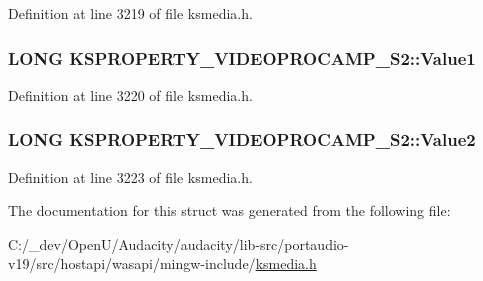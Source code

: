 Definition at line 3219 of file ksmedia.\+h.

\subsubsection[{\texorpdfstring{Value1}{Value1}}]{\setlength{\rightskip}{0pt plus 5cm}L\+O\+NG K\+S\+P\+R\+O\+P\+E\+R\+T\+Y\+\_\+\+V\+I\+D\+E\+O\+P\+R\+O\+C\+A\+M\+P\+\_\+\+S2\+::\+Value1}\hypertarget{struct_k_s_p_r_o_p_e_r_t_y___v_i_d_e_o_p_r_o_c_a_m_p___s2_a60f2292f1cfc6b7eb44bf0ebbc9c877e}{}\label{struct_k_s_p_r_o_p_e_r_t_y___v_i_d_e_o_p_r_o_c_a_m_p___s2_a60f2292f1cfc6b7eb44bf0ebbc9c877e}


Definition at line 3220 of file ksmedia.\+h.

\subsubsection[{\texorpdfstring{Value2}{Value2}}]{\setlength{\rightskip}{0pt plus 5cm}L\+O\+NG K\+S\+P\+R\+O\+P\+E\+R\+T\+Y\+\_\+\+V\+I\+D\+E\+O\+P\+R\+O\+C\+A\+M\+P\+\_\+\+S2\+::\+Value2}\hypertarget{struct_k_s_p_r_o_p_e_r_t_y___v_i_d_e_o_p_r_o_c_a_m_p___s2_a68eb42957cdadb559f384b7fba93c4cd}{}\label{struct_k_s_p_r_o_p_e_r_t_y___v_i_d_e_o_p_r_o_c_a_m_p___s2_a68eb42957cdadb559f384b7fba93c4cd}


Definition at line 3223 of file ksmedia.\+h.



The documentation for this struct was generated from the following file\+:\begin{DoxyCompactItemize}
\item 
C\+:/\+\_\+dev/\+Open\+U/\+Audacity/audacity/lib-\/src/portaudio-\/v19/src/hostapi/wasapi/mingw-\/include/\hyperlink{ksmedia_8h}{ksmedia.\+h}\end{DoxyCompactItemize}
